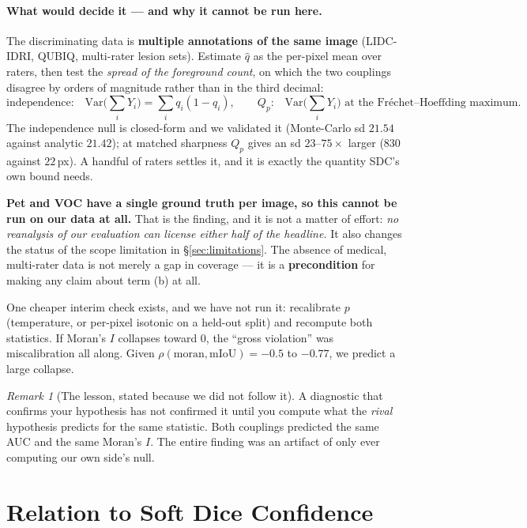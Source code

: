 \documentclass[11pt]{article}
\theoremstyle{remark}
\newtheorem{remark}{Remark}
\begin{document}
\paragraph{What would decide it --- and why it cannot be run here.} The discriminating
data is \textbf{multiple annotations of the same image} (LIDC-IDRI, QUBIQ, multi-rater
lesion sets). Estimate $\hat q$ as the per-pixel mean over raters, then test the
\emph{spread of the foreground count}, on which the two couplings disagree by orders of
magnitude rather than in the third decimal:
\begin{equation}\label{eq:countspread}
\text{independence:}\quad \mathrm{Var}\Big(\sum_i Y_i\Big) = \sum_i q_i(1-q_i),
\qquad
\text{$Q_p$:}\quad \mathrm{Var}\Big(\sum_i Y_i\Big) \text{ at the Fr\'echet--Hoeffding maximum.}
\end{equation}
The independence null is closed-form and we validated it (Monte-Carlo sd $21.54$ against
analytic $21.42$); at matched sharpness $Q_p$ gives an sd $23$--$75\times$ larger ($830$
against $22$\,px). A handful of raters settles it, and it is exactly the quantity SDC's
own bound needs.

\textbf{Pet and VOC have a single ground truth per image, so this cannot be run on our
data at all.} That is the finding, and it is not a matter of effort: \emph{no reanalysis
of our evaluation can license either half of the headline.} It also changes the status
of the scope limitation in \S\ref{sec:limitations}. The absence of medical, multi-rater
data is not merely a gap in coverage --- it is a \textbf{precondition} for making any
claim about term (b) at all.

One cheaper interim check exists, and we have not run it: recalibrate $p$ (temperature,
or per-pixel isotonic on a held-out split) and recompute both statistics. If Moran's $I$
collapses toward $0$, the ``gross violation'' was miscalibration all along. Given
$\rho(\text{moran},\text{mIoU}) = -0.5$ to $-0.77$, we predict a large collapse.

\begin{remark}[The lesson, stated because we did not follow it]\label{rem:rivalnull}
A diagnostic that confirms your hypothesis has not confirmed it until you compute what
the \emph{rival} hypothesis predicts for the same statistic. Both couplings predicted
the same AUC and the same Moran's $I$. The entire finding was an artifact of only ever
computing our own side's null.
\end{remark}

\section{Relation to Soft Dice Confidence}\label{sec:theory}
\end{document}
